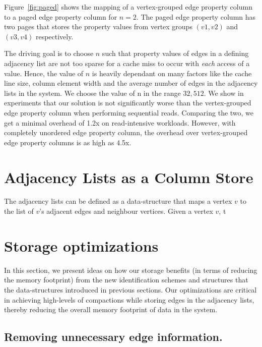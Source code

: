 Figure~\ref{fig:paged} shows the mapping of a vertex-grouped edge property column to a paged edge property column for $n=2$. The paged edge property column has two pages that stores the property values from vertex groups $(v1,v2)$ and $(v3,v4)$ respectively.

The driving goal is to choose $n$ such that property values of edges in a defining adjacency list are not too sparse for a cache miss to occur with \emph{each} access of a value. Hence, the value of $n$ is heavily dependant on many factors like the cache line size, column element width and the average number of edges in the adjacency lists in the system. We choose the value of n in the range $32, 512$. We show in experiments that our solution is not significantly worse than the vertex-grouped edge property column when performing sequential reads. Comparing the two, we get a minimal overhead of 1.2x on read-intensive workloads. However, with completely unordered edge property column, the overhead over vertex-grouped edge property columns is as high as 4.5x.

\section{Adjacency Lists as a Column Store}
\label{sec:adjacency-lists}

The adjacency lists can be defined as a data-structure that maps a vertex $v$ to the list of $v$'s adjacent edges and neighbour vertices. Given a vertex $v$, t




\section{Storage optimizations}
\label{sec:storage-optimizations}

In this section, we present ideas on how our storage benefits (in terms of reducing the memory footprint) from the new identification schemes and structures that the data-structures introduced in previous sections. Our optimizations are critical in achieving high-levels of compactions while storing edges in the adjacency lists, thereby reducing the overall memory footprint of data in the system.

\subsection{Removing unnecessary edge information.}

